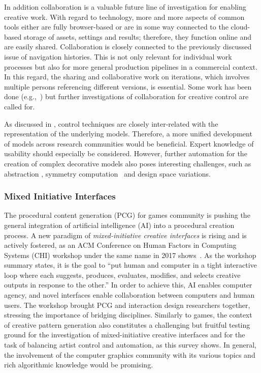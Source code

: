 In addition collaboration is a valuable future line of investigation for enabling creative work. With regard to technology, more and more aspects of common tools either are fully browser-based or are in some way connected to the cloud-based storage of assets, settings and results; therefore, they function online and are easily shared. Collaboration is closely connected to the previously discussed issue of navigation histories. This is not only relevant for individual work processes but also for more general production pipelines in a commercial context. In this regard, the sharing and collaborative work on iterations, which involves multiple persons referencing different versions, is essential. Some work has been done (e.g.,~\cite{talton_2009_emw, salvati_2015_mcm,oleary_2018_csi}) but further investigations of collaboration for creative control are called for. 

As discussed in , control techniques are closely inter-related with the representation of the underlying models. Therefore, a more unified development of models across research communities would be beneficial. Expert knowledge of usability should especially be considered. However, further automation for the creation of complex decorative models also poses interesting challenges, such as abstraction \cite{nan_2011_cgr}, symmetry computation~\cite{cullen_2011_sh} and design space variations.


\subsubsection{Mixed Initiative Interfaces}
\label{subsec:analysis_outlook_mixed_initiative_interfaces}

The procedural content generation (PCG) for games community is pushing the general integration of artificial intelligence (AI) into a procedural creation process. A new paradigm of \textit{mixed-initiative creative interfaces} is rising and is actively fostered, as an ACM Conference on Human Factors in Computing Systems (CHI) workshop under the same name in 2017 shows~\cite{deterding_2017_mci}. As the workshop summary states, it is the goal to ``put human and computer in a tight interactive loop where each suggests, produces, evaluates, modifies, and selects creative outputs in response to the other.'' In order to achieve this, AI enables computer agency, and novel interfaces enable collaboration between computers and human users. The workshop brought PCG and interaction design researchers together, stressing the importance of bridging disciplines. Similarly to games, the context of creative pattern generation also constitutes a challenging but fruitful testing ground for the investigation of mixed-initiative creative interfaces and for the task of balancing artist control and automation, as this survey shows. In general, the involvement of the computer graphics community with its various topics and rich algorithmic knowledge would be promising.

